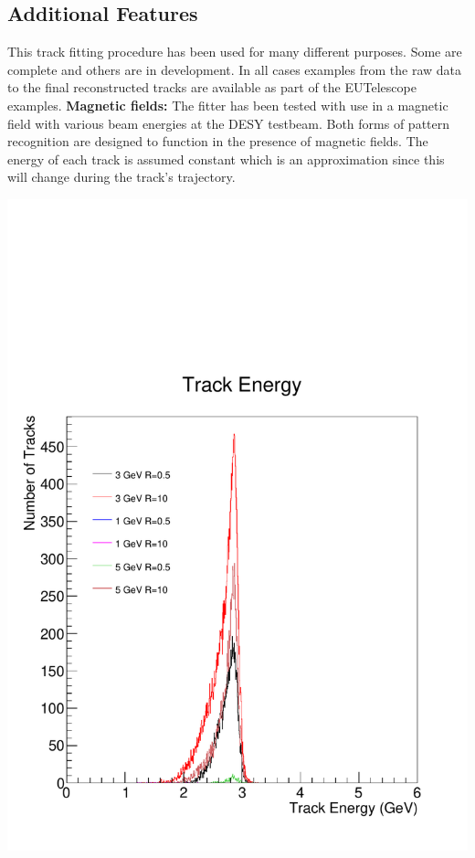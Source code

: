 \documentclass[a0,portrait]{a0poster}
\begin{document}
\begin{multicols}{2}
\section*{Additional Features}
This track fitting procedure has been used for many different purposes. Some are complete and others are in development. In all cases examples from the raw data to the final reconstructed tracks are available as part of the EUTelescope examples. 
\newline
\newline
\textbf{Magnetic fields:} The fitter has been tested with use in a magnetic field with various beam energies at the DESY testbeam. Both forms of pattern recognition are designed to function in the presence of magnetic fields. The energy of each track is assumed constant which is an approximation since this will change during the track's trajectory.
\begin{center}
\includegraphics[width=0.6\linewidth]{figures/beamE3B1.pdf}
\label{trine}
\end{center}


\end{multicols}
\end{document}
